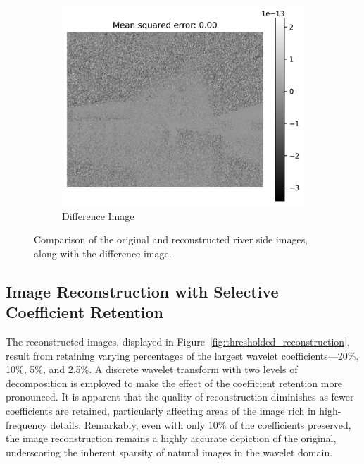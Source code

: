 \documentclass[11pt]{article}
\begin{document}
\begin{figure}[H]
    \begin{subfigure}{.45\textwidth}
        \centering
        \includegraphics[width=\linewidth]{figs/q2c_river_side_difference.jpeg}
        \caption{Difference Image}
        \label{fig:difference_image}
    \end{subfigure}%
    \caption{Comparison of the original and reconstructed river side images, along with the difference image.}
    \label{fig:full_reconstruction}
\end{figure}


\subsection{Image Reconstruction with Selective Coefficient Retention}
The reconstructed images, displayed in Figure~\ref{fig:thresholded_reconstruction}, result from retaining varying percentages of the largest wavelet coefficients---20\%, 10\%, 5\%, and 2.5\%. A discrete wavelet transform with two levels of decomposition is employed to make the effect of  the coefficient retention more pronounced. It is apparent that the quality of reconstruction diminishes as fewer coefficients are retained, particularly affecting areas of the image rich in high-frequency details. Remarkably, even with only 10\% of the coefficients preserved, the image reconstruction remains a highly accurate depiction of the original, underscoring the inherent sparsity of natural images in the wavelet domain.
\end{document}
